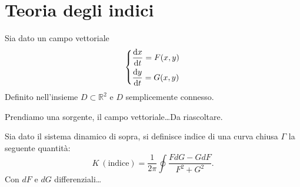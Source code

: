 \section{Teoria degli indici}%
\label{sub:Teoria degli indici}
Sia dato un campo vettoriale 
\[
\begin{dcases}
    \frac{\text{d} x}{\text{d} t} = F(x, y) \\
    \frac{\text{d} y}{\text{d} t} = G(x, y) 
\end{dcases}
\]
Definito nell'insieme $D \subset \mathbb{R}^2$ e $D$ semplicemente connesso.
\begin{exmp}[]
    Prendiamo una sorgente, il campo vettoriale\ldots Da riascoltare. 
\end{exmp}
\noindent
\begin{defn}
    Sia dato il sistema dinamico di sopra, si definisce indice di una curva chiusa $\Gamma$ la seguente quantità:
    \[
	K \ (\text{indice}) = \frac{1}{2\pi}\oint \frac{FdG-GdF}{F^2+G^2}
    .\] 
    Con $dF$ e $dG$ differenziali\ldots
\end{defn}
\noindent
